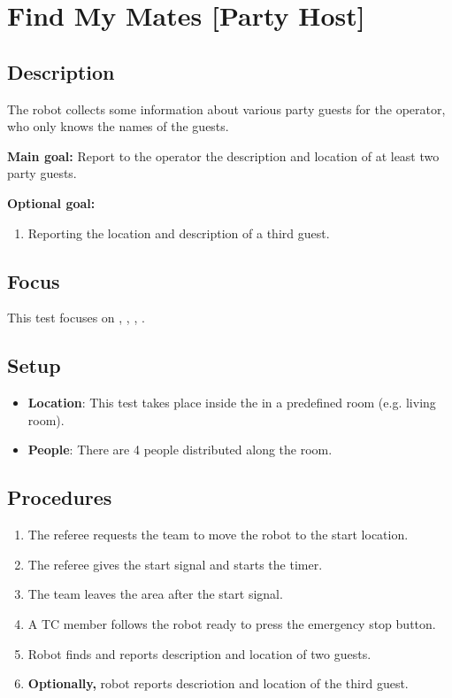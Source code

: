\section{Find My Mates [Party Host]}
\label{test:find-my-mates}

\subsection*{Description}
    The robot collects some information about various party guests for the operator, who only knows the names of the guests.

\textbf{Main goal:}
    Report to the operator the description and location of at least two party guests.

\textbf{Optional goal:}
\begin{enumerate}[nosep]
	\item Reporting the location and description of a third guest.
\end{enumerate}

\subsection*{Focus}
This test focuses on \SysI{}, \HRI{}, \PerDet{}, \PerRec. 

\subsection*{Setup}
\begin{itemize}
	\item \textbf{Location}: This test takes place inside the \Arena{} in a predefined room (e.g. living room).
	\item \textbf{People}: There are 4 people distributed along the room.
\end{itemize}

\subsection*{Procedures}
\begin{enumerate}
	\item The referee requests the team to move the robot to the start location.
	\item The referee gives the start signal and starts the timer.
	\item The team leaves the area after the start signal.
	\item A TC member follows the robot ready to press the emergency stop button. 
	\item Robot finds and reports description and location of two guests.
	\item \textbf{Optionally,} robot reports descriotion and location of the third guest.
\end{enumerate}

